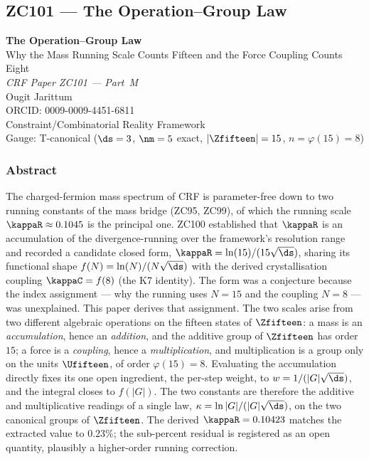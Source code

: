 \documentclass[12pt, a4paper]{article}
\begin{document}
\subsection{ZC101 --- The Operation--Group Law}
\begin{center}
{\LARGE\bfseries The Operation--Group Law}\\[0.4em]
{\large Why the Mass Running Scale Counts Fifteen and the Force Coupling Counts Eight}\\[0.6em]
{\large\itshape CRF Paper ZC101 --- Part~M}\\[0.3em]
{\normalsize Ougit Jarittum}\\[0.15em]
{\footnotesize ORCID: 0009-0009-4451-6811}\\[0.3em]
{\normalsize Constraint/Combinatorial Reality Framework}\\[0.2em]
{\normalsize Gauge: T-canonical ($\ds=3$, $\nm=5$ exact, $|\Zfifteen|=15$, $n=\varphi(15)=8$)}
\end{center}

\bigskip

\subsubsection*{Abstract}
\noindent
The charged-fermion mass spectrum of CRF is parameter-free down to two running
constants of the mass bridge (ZC95, ZC99), of which the running scale
$\kappaR\approx0.1045$ is the principal one. ZC100 established that $\kappaR$ is
an accumulation of the divergence-running over the framework's resolution range
and recorded a candidate closed form, $\kappaR=\ln(15)/(15\sqrt{\ds})$, sharing
its functional shape $f(N)=\ln(N)/(N\sqrt{\ds})$ with the derived
crystallisation coupling $\kappaC=f(8)$ (the K7 identity). The form was a
conjecture because the index assignment --- why the running uses $N=15$ and the
coupling $N=8$ --- was unexplained. This paper derives that assignment. The two
scales arise from two different algebraic operations on the fifteen states of
$\Zfifteen$: a mass is an \emph{accumulation}, hence an \emph{addition}, and the
additive group of $\Zfifteen$ has order $15$; a force is a \emph{coupling},
hence a \emph{multiplication}, and multiplication is a group only on the units
$\Ufifteen$, of order $\varphi(15)=8$. Evaluating the accumulation directly
fixes its one open ingredient, the per-step weight, to $w=1/(|G|\sqrt{\ds})$,
and the integral closes to $f(|G|)$. The two constants are therefore the
additive and multiplicative readings of a single law,
$\kappa=\ln|G|/(|G|\sqrt{\ds})$, on the two canonical groups of $\Zfifteen$. The
derived $\kappaR=0.10423$ matches the extracted value to $0.23\%$; the
sub-percent residual is registered as an open quantity, plausibly a
higher-order running correction.
\end{document}

